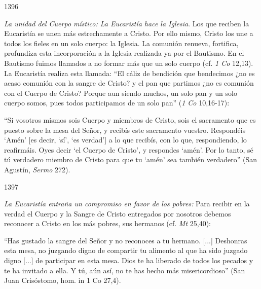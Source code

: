 			\begin{ccebody}\begin{ccenumber}1396\end{ccenumber} \textit{La unidad del Cuerpo místico: La Eucaristía hace la Iglesia}. Los que reciben la Eucaristía se unen más estrechamente a Cristo. Por ello mismo, Cristo los une a todos los fieles en un solo cuerpo: la Iglesia. La comunión renueva, fortifica, profundiza esta incorporación a la Iglesia realizada ya por el Bautismo. En el Bautismo fuimos llamados a no formar más que un solo cuerpo (cf. \textit{1 Co} 12,13). La Eucaristía realiza esta llamada: “El cáliz de bendición que bendecimos ¿no es acaso comunión con la sangre de Cristo? y el pan que partimos ¿no es comunión con el Cuerpo de Cristo? Porque aun siendo muchos, un solo pan y un solo cuerpo somos, pues todos participamos de un solo pan” (\textit{1 Co} 10,16-17):\end{ccebody}
			
			\begin{ccecite}“Si vosotros mismos sois Cuerpo y miembros de Cristo, sois el sacramento que es puesto sobre la mesa del Señor, y recibís este sacramento vuestro. Respondéis ‘Amén’ [es decir, ‘sí’, ‘es verdad’] a lo que recibís, con lo que, respondiendo, lo reafirmáis. Oyes decir ‘el Cuerpo de Cristo’, y respondes ‘amén’. Por lo tanto, sé tú verdadero miembro de Cristo para que tu ‘amén’ sea también verdadero” (San Agustín, \textit{Sermo} 272).\end{ccecite}
			
			\begin{ccebody}\begin{ccenumber}1397\end{ccenumber} \textit{La Eucaristía entraña un compromiso en favor de los pobres:} Para recibir en la verdad el Cuerpo y la Sangre de Cristo entregados por nosotros debemos reconocer a Cristo en los más pobres, sus hermanos (cf. \textit{Mt} 25,40):\end{ccebody}
			
			\begin{ccecite}“Has gustado la sangre del Señor y no reconoces a tu hermano. [...] Deshonras esta mesa, no juzgando digno de compartir tu alimento al que ha sido juzgado digno [...] de participar en esta mesa. Dios te ha liberado de todos los pecados y te ha invitado a ella. Y tú, aún así, no te has hecho más misericordioso” (San Juan Crisóstomo, hom. in 1 Co 27,4).\end{ccecite}
			
